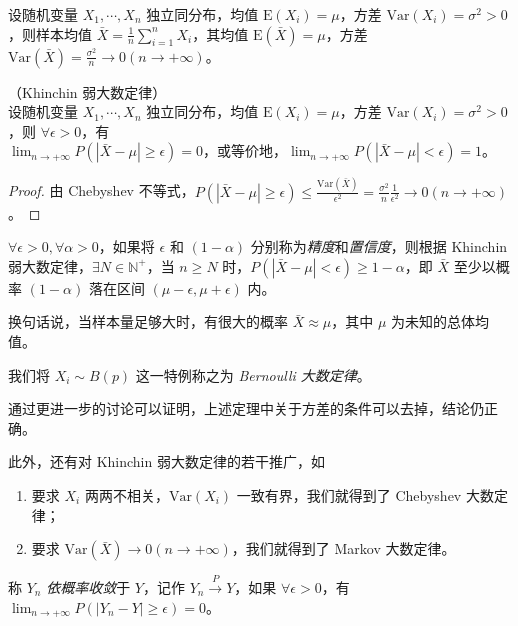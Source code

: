 \documentclass[../main.tex]{subfiles}
\begin{document}
设随机变量 $X_1,\cdots,X_n$ 独立同分布，均值 $\mathrm E(X_i)=\mu$，方差 $\mathrm{Var}(X_i)=\sigma^2>0$，则样本均值 $\bar X=\frac1n\sum_{i=1}^nX_i$，其均值 $\mathrm E(\bar X)=\mu$，方差 $\mathrm{Var}(\bar X)=\frac{\sigma^2}n\rightarrow0(n\rightarrow+\infty)$。


\begin{theorem}\label{thm:5.2.1}
    （Khinchin 弱大数定律）\\
    设随机变量 $X_1,\cdots,X_n$ 独立同分布，均值 $\mathrm E(X_i)=\mu$，方差 $\mathrm{Var}(X_i)=\sigma^2>0$，则 $\forall\epsilon>0$，有\\
    $\lim_{n\rightarrow+\infty}P(|\bar X-\mu|\geq\epsilon)=0$，或等价地，$\lim_{n\rightarrow+\infty}P(|\bar X-\mu|<\epsilon)=1$。
\end{theorem}

\begin{proof}
    由 Chebyshev 不等式，$P(|\bar X-\mu|\geq\epsilon)\leq\frac{\mathrm{Var}(\bar X)}{\epsilon^2}=\frac{\sigma^2}n\frac1{\epsilon^2}\rightarrow0(n\rightarrow+\infty)$。
\end{proof}

$\forall\epsilon>0,\forall\alpha>0$，如果将 $\epsilon$ 和 $(1-\alpha)$ 分别称为\emph{精度}和\emph{置信度}，则根据 Khinchin 弱大数定律，$\exists N\in\mathbb N^+$，当 $n\geq N$ 时，$P(|\bar X-\mu|<\epsilon)\geq1-\alpha$，即 $\bar X$ 至少以概率 $(1-\alpha)$ 落在区间 $(\mu-\epsilon,\mu+\epsilon)$ 内。

换句话说，当样本量足够大时，有很大的概率 $\bar X\approx\mu$，其中 $\mu$ 为未知的总体均值。

我们将 $X_i\sim B(p)$ 这一特例称之为 \emph{Bernoulli 大数定律}。

通过更进一步的讨论可以证明，上述定理中关于方差的条件可以去掉，结论仍正确。

此外，还有对 Khinchin 弱大数定律的若干推广，如
\begin{enumerate}
    \item 要求 $X_i$ 两两不相关，$\mathrm{Var}(X_i)$ 一致有界，我们就得到了 Chebyshev 大数定律；
    \item 要求 $\mathrm{Var}(\bar X)\rightarrow0(n\rightarrow+\infty)$，我们就得到了 Markov 大数定律。
\end{enumerate}

\begin{definition}\label{def:5.2.1}
    称 $Y_n$ \emph{依概率收敛}于 $Y$，记作 $Y_n\overset{P}\rightarrow Y$，如果 $\forall\epsilon>0$，有 $\lim_{n\rightarrow+\infty}P(|Y_n-Y|\geq\epsilon)=0$。
\end{definition}
\end{document}
